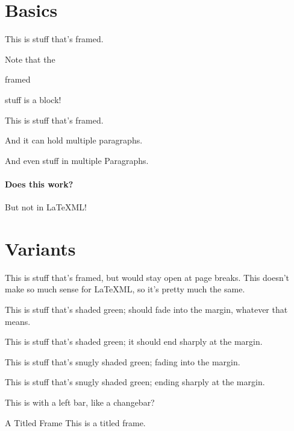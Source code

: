 \documentclass{article}
\begin{document}
\section{Basics}

\begin{framed}
This is stuff that's framed.
\end{framed}

Note that the \begin{framed}framed\end{framed} stuff is a block!

\begin{framed}
This is stuff that's framed.

And it can hold multiple paragraphs.
\end{framed}

\begin{framed}
And even stuff in multiple Paragraphs.

\paragraph{Does this work?} But not in LaTeXML!
\end{framed}

\section{Variants}
\begin{oframed}
This is stuff that's framed, but would stay open at page breaks.
This doesn't make so much sense for LaTeXML, so it's pretty much
the same.
\end{oframed}

\begin{shaded}
This is stuff that's shaded green;
should fade into the margin, whatever that means.
\end{shaded}

\begin{shaded*}
This is stuff that's shaded green;
it should end sharply at the margin.
\end{shaded*}

\begin{snugshade}
This is stuff that's snugly shaded green;
fading into the margin.
\end{snugshade}

\begin{snugshade*}
This is stuff that's snugly shaded green;
ending sharply at the margin.
\end{snugshade*}

\begin{leftbar}
This is with a left bar, like a changebar?
\end{leftbar}

\begin{titled-frame}{A Titled Frame}
This is a titled frame.
\end{titled-frame}
\end{document}
